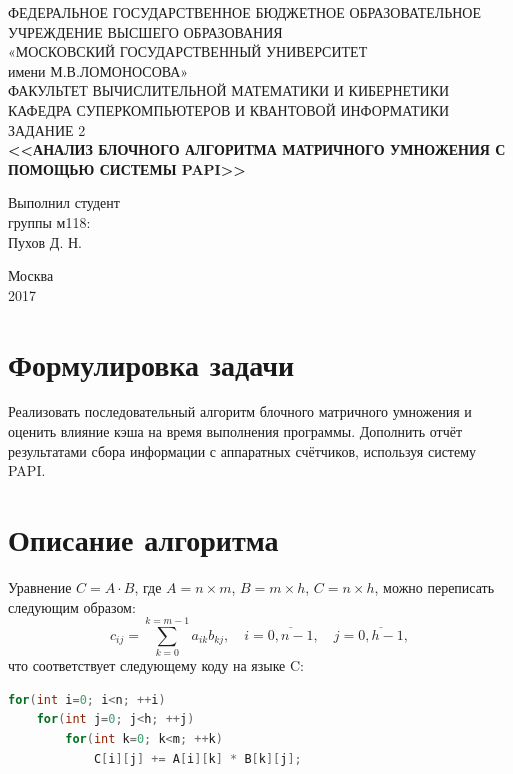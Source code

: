 \documentclass[14pt]{extarticle}
\begin{document}
\begin{titlepage}
	\begin{center}
		\small{ФЕДЕРАЛЬНОЕ ГОСУДАРСТВЕННОЕ БЮДЖЕТНОЕ ОБРАЗОВАТЕЛЬНОЕ}\\ 
			УЧРЕЖДЕНИЕ ВЫСШЕГО ОБРАЗОВАНИЯ\\
			«МОСКОВСКИЙ ГОСУДАРСТВЕННЫЙ УНИВЕРСИТЕТ\\
			имени М.В.ЛОМОНОСОВА»\\
		\hfill \break
		ФАКУЛЬТЕТ ВЫЧИСЛИТЕЛЬНОЙ МАТЕМАТИКИ И КИБЕРНЕТИКИ\\
		КАФЕДРА СУПЕРКОМПЬЮТЕРОВ И КВАНТОВОЙ ИНФОРМАТИКИ\\
		\vfill
		ЗАДАНИЕ 2 \\
		\textbf{<<АНАЛИЗ БЛОЧНОГО АЛГОРИТМА МАТРИЧНОГО УМНОЖЕНИЯ С ПОМОЩЬЮ СИСТЕМЫ PAPI>>}\\
	\end{center}	
	\vfill
	\begin{flushright}
		Выполнил студент \\
		группы м118:\\
		Пухов Д. Н.\\
		{\hspace{3cm}}
	\end{flushright}
	
	
	\begin{center}
		Москва \\
		2017 
	\end{center}
	
	\thispagestyle{empty}

\end{titlepage}





\section*{Формулировка задачи} 
Реализовать последовательный алгоритм блочного матричного умножения и оценить влияние кэша на время выполнения программы. Дополнить отчёт результатами сбора информации с аппаратных счётчиков, используя систему PAPI.

\section*{Описание алгоритма}
Уравнение $ C = A \cdot B $, где $ A = n \times m $, $ B = m \times h $, $ C = n \times h $, можно переписать следующим образом:
\begin{equation*}
c_{ij} = \sum \limits_{k=0}^{k=m-1} a_{ik} b_{kj}, \quad i = \overline{0,n-1}, \quad j = \overline{0,h-1},
\end{equation*}
что соответствует следующему коду на языке C:
\begin{lstlisting}[language=C]
for(int i=0; i<n; ++i)
	for(int j=0; j<h; ++j)
		for(int k=0; k<m; ++k)
			C[i][j] += A[i][k] * B[k][j];
\end{lstlisting}
\end{document}
